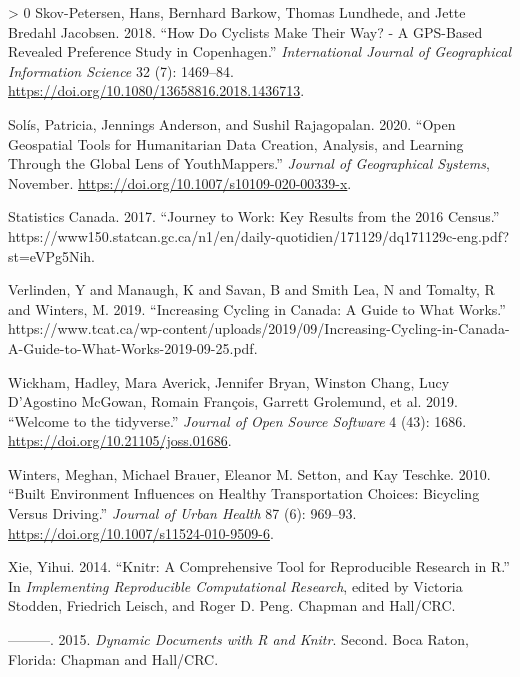 \documentclass[smallextended]{svjour3}       %
\newlength{\cslhangindent}
\newenvironment{CSLReferences}[3] %
 {%
  \setlength{\parindent}{0pt}
  \ifodd #1 \everypar{\setlength{\hangindent}{\cslhangindent}}\ignorespaces\fi
  \ifnum #2 > 0
  \setlength{\parskip}{#2\baselineskip}
  \fi
 }%
 {}
\begin{document}
\begin{CSLReferences}{1}{0}
\leavevmode\hypertarget{ref-SkovPetersen2018}{}%
Skov-Petersen, Hans, Bernhard Barkow, Thomas Lundhede, and Jette Bredahl
Jacobsen. 2018. {``How Do Cyclists Make Their Way? - {A GPS}-Based
Revealed Preference Study in {Copenhagen}.''} \emph{International
Journal of Geographical Information Science} 32 (7): 1469--84.
\url{https://doi.org/10.1080/13658816.2018.1436713}.

\leavevmode\hypertarget{ref-solisOpenGeospatialTools2020}{}%
Solís, Patricia, Jennings Anderson, and Sushil Rajagopalan. 2020.
{``Open Geospatial Tools for Humanitarian Data Creation, Analysis, and
Learning Through the Global Lens of {YouthMappers}.''} \emph{Journal of
Geographical Systems}, November.
\url{https://doi.org/10.1007/s10109-020-00339-x}.

\leavevmode\hypertarget{ref-Statscan2017}{}%
Statistics Canada. 2017. {``Journey to Work: {Key} Results from the 2016
{Census}.''}
https://www150.statcan.gc.ca/n1/en/daily-quotidien/171129/dq171129c-eng.pdf?st=eVPg5Nih.

\leavevmode\hypertarget{ref-Verlinden2019}{}%
Verlinden, Y and Manaugh, K and Savan, B and Smith Lea, N and Tomalty, R
and Winters, M. 2019. {``Increasing {Cycling} in {Canada}: {A} Guide to
What Works.''}
https://www.tcat.ca/wp-content/uploads/2019/09/Increasing-Cycling-in-Canada-A-Guide-to-What-Works-2019-09-25.pdf.

\leavevmode\hypertarget{ref-Wickham2019}{}%
Wickham, Hadley, Mara Averick, Jennifer Bryan, Winston Chang, Lucy
D'Agostino McGowan, Romain François, Garrett Grolemund, et al. 2019.
{``Welcome to the {tidyverse}.''} \emph{Journal of Open Source Software}
4 (43): 1686. \url{https://doi.org/10.21105/joss.01686}.

\leavevmode\hypertarget{ref-Winters2010}{}%
Winters, Meghan, Michael Brauer, Eleanor M. Setton, and Kay Teschke.
2010. {``Built Environment Influences on Healthy Transportation Choices:
{Bicycling} Versus Driving.''} \emph{Journal of Urban Health} 87 (6):
969--93. \url{https://doi.org/10.1007/s11524-010-9509-6}.

\leavevmode\hypertarget{ref-Xie2014}{}%
Xie, Yihui. 2014. {``Knitr: {A} Comprehensive Tool for Reproducible
Research in {R}.''} In \emph{Implementing Reproducible Computational
Research}, edited by Victoria Stodden, Friedrich Leisch, and Roger D.
Peng. {Chapman and Hall/CRC}.

\leavevmode\hypertarget{ref-Xie2015}{}%
---------. 2015. \emph{Dynamic Documents with {R} and Knitr}. Second.
{Boca Raton, Florida}: {Chapman and Hall/CRC}.


\end{CSLReferences}
\end{document}

